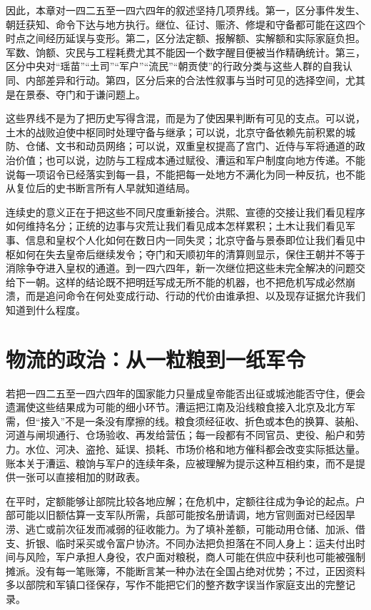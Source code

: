 因此，本章对一四二五至一四六四年的叙述坚持几项界线。第一，区分事件发生、朝廷获知、命令下达与地方执行。继位、征讨、赈济、修堤和守备都可能在这四个时点之间经历延误与变形。第二，区分法定额、报解额、实解额和实际家庭负担。军数、饷额、灾民与工程耗费尤其不能因一个数字醒目便被当作精确统计。第三，区分中央对“瑶苗”“土司”“军户”“流民”“朝贡使”的行政分类与这些人群的自我认同、内部差异和行动。第四，区分后来的合法性叙事与当时可见的选择空间，尤其是在景泰、夺门和于谦问题上。

这些界线不是为了把历史写得含混，而是为了使因果判断有可见的支点。可以说，土木的战败迫使中枢同时处理守备与继承；可以说，北京守备依赖先前积累的城防、仓储、文书和动员网络；可以说，双重皇权提高了宫门、近侍与军将通道的政治价值；也可以说，边防与工程成本通过赋役、漕运和军户制度向地方传递。不能说每一项诏令已经落实到每一县，不能把每一处地方不满化为同一种反抗，也不能从复位后的史书断言所有人早就知道结局。

连续史的意义正在于把这些不同尺度重新接合。洪熙、宣德的交接让我们看见程序如何维持名分；正统的边事与灾荒让我们看见成本怎样累积；土木让我们看见军事、信息和皇权个人化如何在数日内一同失灵；北京守备与景泰即位让我们看见中枢如何在失去皇帝后继续发令；夺门和天顺初年的清算则显示，保住王朝并不等于消除争夺进入皇权的通道。到一四六四年，新一次继位把这些未完全解决的问题交给下一朝。这样的结论既不把明廷写成无所不能的机器，也不把危机写成必然崩溃，而是追问命令在何处变成行动、行动的代价由谁承担、以及现存证据允许我们知道到什么程度。
\section{物流的政治：从一粒粮到一纸军令}

若把一四二五至一四六四年的国家能力只量成皇帝能否出征或城池能否守住，便会遗漏使这些结果成为可能的细小环节。漕运把江南及沿线粮食接入北京及北方军需，但“接入”不是一条没有摩擦的线。粮食须经征收、折色或本色的换算、装船、河道与闸坝通行、仓场验收、再发给营伍；每一段都有不同官员、吏役、船户和劳力。水位、河决、盗抢、延误、损耗、市场价格和地方催科都会改变实际抵达量。账本关于漕运、粮饷与军户的连续年条，应被理解为提示这种互相约束，而不是提供一张可以直接相加的财政表。

在平时，定额能够让部院比较各地应解；在危机中，定额往往成为争论的起点。户部可能以旧额估算一支军队所需，兵部可能按名册请调，地方官则面对已经因旱涝、逃亡或前次征发而减弱的征收能力。为了填补差额，可能动用仓储、加派、借支、折银、临时采买或令富户协济。不同办法把负担落在不同人身上：运夫付出时间与风险，军户承担人身役，农户面对粮税，商人可能在供应中获利也可能被强制摊派。没有每一笔账簿，不能断言某一种办法在全国占绝对优势；不过，正因资料多以部院和军镇口径保存，写作不能把它们的整齐数字误当作家庭支出的完整记录。

